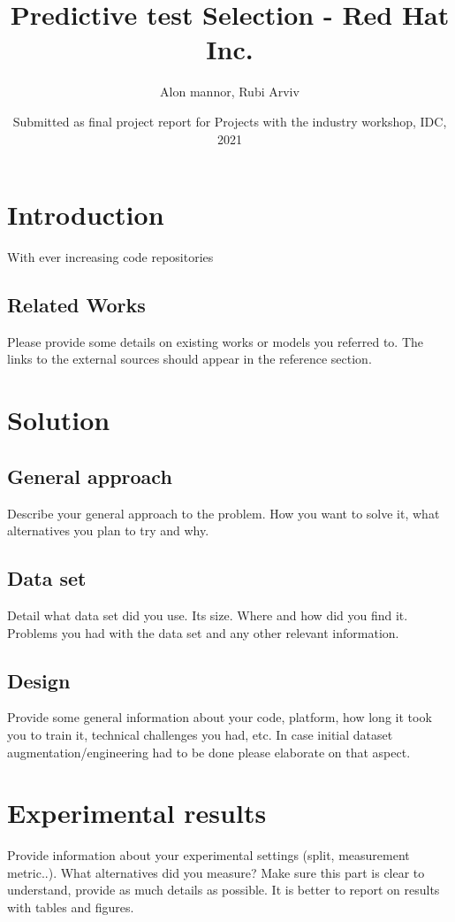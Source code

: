 \documentclass{article}
\title{Predictive test Selection - Red Hat Inc.}
\author{Alon mannor, Rubi Arviv}
\date{Submitted as final project report for Projects with the industry workshop, IDC, 2021}
\begin{document}
\maketitle

\section{Introduction}

With ever increasing code repositories 
\subsection{Related Works}
Please provide some details on existing works or models you referred to. The links to the external sources should appear in the reference section.  


\section{Solution}
\subsection{General approach}
Describe your general approach to the problem. How you want to solve it, what alternatives you plan to try and why. 

\subsection{Data set}
Detail what data set did you use. Its size. Where and how did you find it. Problems you had with the data set and  any other relevant information.

\subsection{Design}
Provide some general information about your code, platform, how long it took you to train it, technical challenges you had, etc. In case initial dataset augmentation/engineering had to be done please elaborate on that aspect.

\section{Experimental results}
Provide information about your experimental settings (split, measurement metric..). What alternatives did you measure? Make sure this part is clear to understand, provide as much details as possible. It is better to report on results with tables and figures.
\end{document}
